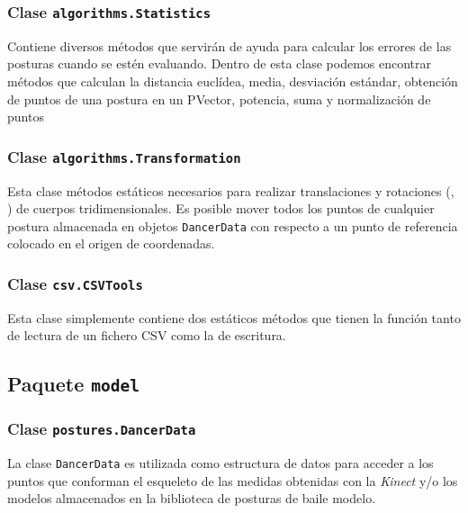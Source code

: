 \documentclass[10pt,a4paper]{report}
\begin{document}
	
	
	\subsubsection{Clase \texttt{algorithms.Statistics}}
	Contiene diversos métodos que servirán de ayuda para calcular los errores de las posturas cuando se estén evaluando.
Dentro de esta clase podemos encontrar métodos que calculan la distancia euclídea, media, desviación estándar, obtención de puntos de una postura en un PVector, potencia, suma y normalización de puntos

	
	
	\subsubsection{Clase \texttt{algorithms.Transformation}}
	Esta clase métodos estáticos necesarios para realizar translaciones y rotaciones (\cite{rotation-matrix}, \cite{rotation}) de cuerpos tridimensionales. Es posible mover todos los puntos de cualquier postura almacenada en objetos \texttt{DancerData} con respecto a un punto de referencia colocado en el origen de coordenadas.
	
	
	
	\subsubsection{Clase \texttt{csv.CSVTools}}
	Esta clase simplemente contiene dos estáticos métodos que tienen la función tanto de lectura de un fichero CSV como la de escritura.

	
	
	\subsection{Paquete \texttt{model}}
	\subsubsection{Clase \texttt{postures.DancerData}}
	La clase \texttt{DancerData} es utilizada como estructura de datos para acceder a los puntos que conforman el esqueleto de las medidas obtenidas con la \textit{Kinect} y/o los modelos almacenados en la biblioteca de posturas de baile modelo.
	
\end{document}
